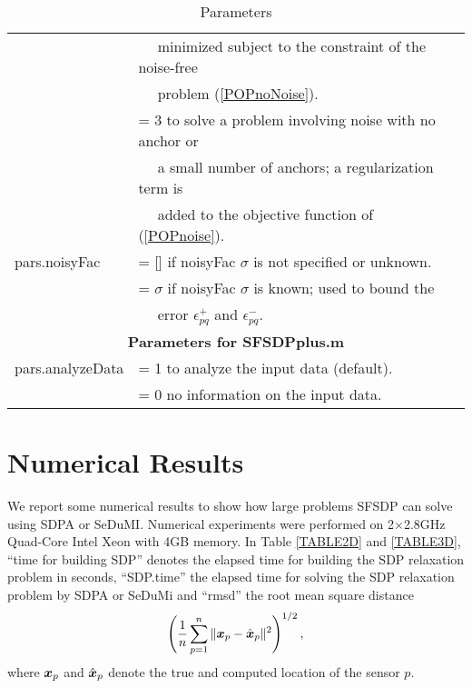 \documentclass[12pt]{article}
\def\x{\mbox{\boldmath $x$}}
\begin{document}
\begin{table}[htdp]
\begin{tabular}{| l l |}
          &   \mbox{ \ } \hspace{2mm}   minimized subject to the constraint of the noise-free \\
          &   \mbox{ \ } \hspace{2mm}   problem  (\ref{POPnoNoise}). \\ 
           & =  3 to solve a problem involving  noise  with no anchor or\\
           & \mbox{ \ } \hspace{2mm}  a small number of anchors;  a regularization term is \\ 
           & \mbox{ \ } \hspace{2mm} added to the objective function of  (\ref{POPnoise}). \\ 
       \hline
       pars.noisyFac 
           & = []  if noisyFac $\sigma$ is not specified or unknown.  \\
           & = $\sigma$  if noisyFac $\sigma$ is known; used to bound the \\ 
           &  \mbox{ \ } \hspace{2mm}  error $\epsilon_{pq}^+$ and $\epsilon_{pq}^-$. \\ \hline
       \hline
\multicolumn{2}{|c|}{\bf Parameters for SFSDPplus.m}    \\ \hline
       pars.analyzeData 
            & = 1  to analyze  the input data (default).  \\
           & =  0   no information on the input data. \\
\hline
  \end{tabular}
  \caption{Parameters}
   \label{PARAM2} 
  \end{table}          


\section{Numerical Results}

We report some numerical results to show how large problems SFSDP
can solve using SDPA or SeDuMI.  
Numerical experiments were performed 
on 2$\times$2.8GHz Quad-Core Intel Xeon  
with 4GB memory.  In Table \ref{TABLE2D} and \ref{TABLE3D},
 ``time for building SDP''  denotes the 
elapsed time for building the SDP relaxation problem in seconds, ``SDP.time''  the elapsed time for solving the SDP relaxation 
problem by SDPA or SeDuMi and ``rmsd'' the root mean square distance
\[
\left( \frac{1}{n} \sum_{p=1}^n \| \x_p - \hat{\x}_p \|^2 \right)^{1/2}, 
\]
where $\x_p$ and $\hat{\x}_p$
denote the true and computed location of the sensor $p$. 
\end{document}
